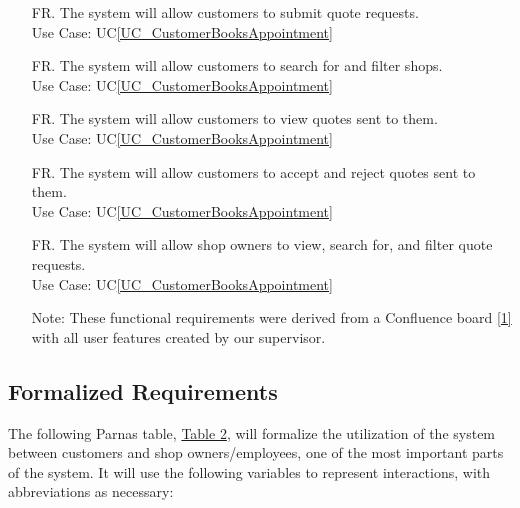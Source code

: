\documentclass[12pt]{article}
\newcounter{reqnum} %
\begin{document}
\begin{itemize}
\item[FR\refstepcounter{reqnum}\thereqnum \label{R_SubmitQuoteRequests}.] The system will allow customers to submit quote requests.\\
Use Case: UC\ref{UC_CustomerBooksAppointment}

\item[FR\refstepcounter{reqnum}\thereqnum \label{R_SearchShop}.] The system will allow customers to search for and filter shops.\\
Use Case: UC\ref{UC_CustomerBooksAppointment}

\item[FR\refstepcounter{reqnum}\thereqnum \label{R_CustViewQuote}.] The system will allow customers to view quotes sent to them.\\
Use Case: UC\ref{UC_CustomerBooksAppointment}

\item[FR\refstepcounter{reqnum}\thereqnum \label{R_AcceptREjectQuote}.] The system will allow customers to accept and reject quotes sent to them.\\
Use Case: UC\ref{UC_CustomerBooksAppointment}

\item[FR\refstepcounter{reqnum}\thereqnum \label{R_ViewQuoteReqs}.] The system will allow shop owners  to view, search for, and filter quote requests.\\
Use Case: UC\ref{UC_CustomerBooksAppointment}

Note: These functional requirements were derived from a Confluence board \hyperref[1]{[1]} with all user features created by our supervisor.

\end{itemize}

\subsection{Formalized Requirements}

The following Parnas table, \hyperref[tab:formal]{Table 2}, will formalize the utilization of the system between customers and shop owners/employees, one of the most important parts of the system. It will use the following variables to represent interactions, with abbreviations as necessary:
\end{document}
